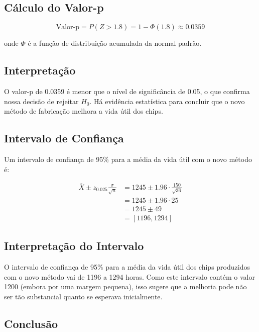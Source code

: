 \documentclass[a4paper,12pt]{article}
\begin{document}
\subsection{Cálculo do Valor-p}

\begin{equation}
\text{Valor-p} = P(Z > 1.8) = 1 - \Phi(1.8) \approx 0.0359
\end{equation}

onde $\Phi$ é a função de distribuição acumulada da normal padrão.

\subsection{Interpretação}

O valor-p de 0.0359 é menor que o nível de significância de 0.05, o que confirma nossa decisão de rejeitar $H_0$. Há evidência estatística para concluir que o novo método de fabricação melhora a vida útil dos chips.

\subsection{Intervalo de Confiança}

Um intervalo de confiança de 95\% para a média da vida útil com o novo método é:

\begin{align}
\overline{X} \pm z_{0.025} \frac{\sigma}{\sqrt{n}} &= 1245 \pm 1.96 \cdot \frac{150}{\sqrt{36}} \\
&= 1245 \pm 1.96 \cdot 25 \\
&= 1245 \pm 49 \\
&= [1196, 1294]
\end{align}

\subsection{Interpretação do Intervalo}

O intervalo de confiança de 95\% para a média da vida útil dos chips produzidos com o novo método vai de 1196 a 1294 horas. Como este intervalo contém o valor 1200 (embora por uma margem pequena), isso sugere que a melhoria pode não ser tão substancial quanto se esperava inicialmente.

\subsection{Conclusão}
\end{document}
